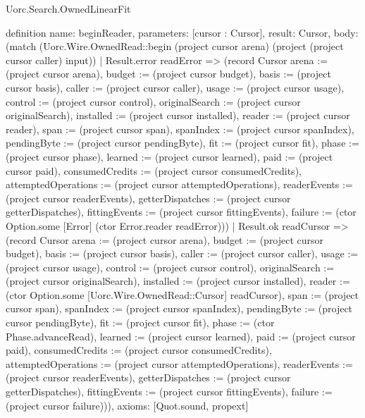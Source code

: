 \begin{lexlean}{Uorc.Search.OwnedLinearFit}
\begin{semanticmodule}
definition{
  name: beginReader,
  parameters: [cursor : Cursor],
  result: Cursor,
  body: (match (Uorc.Wire.OwnedRead::begin (project cursor arena) (project (project cursor caller) input))
    | Result.error readError => (record Cursor {arena := (project cursor arena), budget := (project cursor budget), basis := (project cursor basis), caller := (project cursor caller), usage := (project cursor usage), control := (project cursor control), originalSearch := (project cursor originalSearch), installed := (project cursor installed), reader := (project cursor reader), span := (project cursor span), spanIndex := (project cursor spanIndex), pendingByte := (project cursor pendingByte), fit := (project cursor fit), phase := (project cursor phase), learned := (project cursor learned), paid := (project cursor paid), consumedCredits := (project cursor consumedCredits), attemptedOperations := (project cursor attemptedOperations), readerEvents := (project cursor readerEvents), getterDispatches := (project cursor getterDispatches), fittingEvents := (project cursor fittingEvents), failure := (ctor Option.some [Error] (ctor Error.reader readError))})
    | Result.ok readCursor => (record Cursor {arena := (project cursor arena), budget := (project cursor budget), basis := (project cursor basis), caller := (project cursor caller), usage := (project cursor usage), control := (project cursor control), originalSearch := (project cursor originalSearch), installed := (project cursor installed), reader := (ctor Option.some [Uorc.Wire.OwnedRead::Cursor] readCursor), span := (project cursor span), spanIndex := (project cursor spanIndex), pendingByte := (project cursor pendingByte), fit := (project cursor fit), phase := (ctor Phase.advanceRead), learned := (project cursor learned), paid := (project cursor paid), consumedCredits := (project cursor consumedCredits), attemptedOperations := (project cursor attemptedOperations), readerEvents := (project cursor readerEvents), getterDispatches := (project cursor getterDispatches), fittingEvents := (project cursor fittingEvents), failure := (project cursor failure)})),
  axioms: [Quot.sound, propext]
}


\end{semanticmodule}
\end{lexlean}
